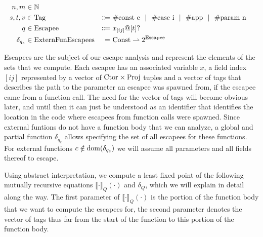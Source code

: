 \begin{alignat*}{3}
  n, m &\in \mathbb{N} \\
  s, t, v &\in \mathrm{Tag} &\Coloneqq&\ \#\textrm{const c} \ \ |\ \  \#\textrm{case i} \ \ |\ \  \#\textrm{app} \ \ |\ \  \#\textrm{param n} \\
  q &\in \mathrm{Escapee}\ &\Coloneqq&\ x_{[ij]} @ [t]? \\
  \delta_{q_e} &\in \mathrm{ExternFunEscapees} &=&\ \mathrm{Const} \rightharpoonup 2^{\mathrm{Escapee}}
\end{alignat*}

Escapees are the subject of our escape analysis and represent the elements of the sets that we compute. Each escapee has an associated variable $x$, a field index $[ij]$ represented by a vector of $\mathrm{Ctor} \times \mathrm{Proj}$ tuples and a vector of tags that describes the path to the parameter an escapee was spawned from, if the escapee came from a function call. The need for the vector of tags will become obvious later, and until then it can just be understood as an identifier that identifies the location in the code where escapees from function calls were spawned. Since external funtions do not have a function body that we can analyze, a global and partial function $\delta_{q_e}$ allows specifying the set of all escapees for these functions. For external functions $c \notin \mathrm{dom}(\delta_{q_e})$ we will assume all parameters and all fields thereof to escape.

\newcommand{\ecp}[2]{\llbracket {#1} \rrbracket_Q \left( {#2} \right)}

Using abstract interpretation, we compute a least fixed point of the following mutually recursive equations $\ecp{\cdot}{\cdot}$ and $\delta_Q$, which we will explain in detail along the way. The first parameter of $\ecp{\cdot}{\cdot}$ is the portion of the function body that we want to compute the escapees for, the second parameter denotes the vector of tags thus far from the start of the function to this portion of the function body.

